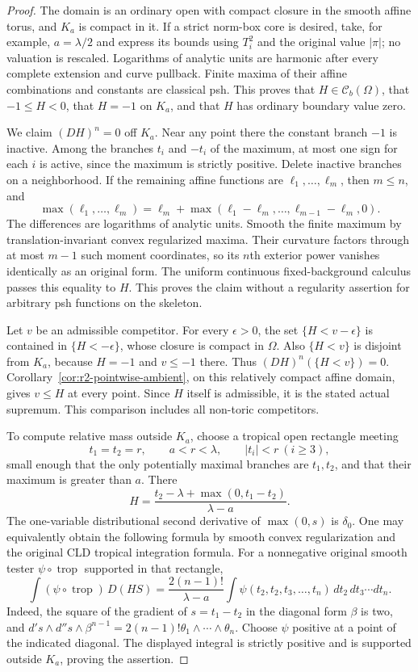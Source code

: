 \documentclass[11pt,a4paper]{article}
\numberwithin{equation}{section}
\theoremstyle{definition}
\theoremstyle{remark}
\newcommand{\Cb}{\mathcal C_b}
\begin{document}
\begin{proof}
The domain is an ordinary open with compact closure in the
smooth affine torus, and $K_a$ is compact in it. If a strict
norm-box core is desired, take, for example, $a=\lambda/2$
and express its bounds using $T_i^2$ and the original value
$|\pi|$; no valuation is rescaled. Logarithms of analytic units
are harmonic after every complete extension and curve pullback.
Finite maxima of their affine combinations and constants are
classical psh. This proves that $H\in\Cb(\Omega)$, that
$-1\leq H<0$, that $H=-1$ on $K_a$, and that $H$ has ordinary
boundary value zero.

We claim $(DH)^n=0$ off $K_a$. Near any point there the constant
branch $-1$ is inactive. Among the branches $t_i$ and $-t_i$
of the maximum, at most one sign for each $i$ is active, since
the maximum is strictly positive. Delete inactive branches
on a neighborhood. If the remaining affine functions are
$\ell_1,\ldots,\ell_m$, then $m\leq n$, and
\[
 \max(\ell_1,\ldots,\ell_m)
    =\ell_m+\max(\ell_1-\ell_m,\ldots,
                         \ell_{m-1}-\ell_m,0).
\]
The differences are logarithms of analytic units. Smooth the
finite maximum by translation-invariant convex regularized
maxima. Their curvature factors through at most $m-1$ such
moment coordinates, so its $n$th exterior power vanishes
identically as an original form. The uniform continuous
fixed-background calculus passes this equality to $H$.
This proves the claim without a regularity assertion for
arbitrary psh functions on the skeleton.

Let $v$ be an admissible competitor. For every $\epsilon>0$,
the set $\{H<v-\epsilon\}$ is contained in
$\{H<-\epsilon\}$, whose closure is compact in $\Omega$.
Also $\{H<v\}$ is disjoint from $K_a$, because $H=-1$ and
$v\leq-1$ there. Thus $(DH)^n(\{H<v\})=0$.
Corollary~\ref{cor:r2-pointwise-ambient}, on this relatively
compact affine domain, gives $v\leq H$ at every point.
Since $H$ itself is admissible, it is the stated actual
supremum. This comparison includes all non-toric competitors.

To compute relative mass outside $K_a$, choose a tropical open
rectangle meeting
\[
 t_1=t_2=r,\qquad a<r<\lambda,
 \qquad |t_i|<r\ (i\geq3),
\]
small enough that the only potentially maximal branches are
$t_1,t_2$, and that their maximum is greater than $a$.
There
\[
 H=\frac{t_2-\lambda+\max(0,t_1-t_2)}{\lambda-a}.
\]
The one-variable distributional second derivative of
$\max(0,s)$ is $\delta_0$. One may equivalently obtain the
following formula by smooth convex regularization and the
original CLD tropical integration formula. For a nonnegative
original smooth tester $\psi\circ\operatorname{trop}$ supported
in that rectangle,
\[
 \int(\psi\circ\operatorname{trop})\,D(HS)
   =\frac{2(n-1)!}{\lambda-a}
     \int\psi(t_2,t_2,t_3,\ldots,t_n)
                    \,dt_2\,dt_3\cdots dt_n.
\]
Indeed, the square of the gradient of $s=t_1-t_2$ in the
diagonal form $\beta$ is two, and
$d's\wedge d''s\wedge\beta^{n-1}
 =2(n-1)!\theta_1\wedge\cdots\wedge\theta_n$.
Choose $\psi$ positive at a point of the indicated diagonal.
The displayed integral is strictly positive and is supported
outside $K_a$, proving the assertion.
\end{proof}
\end{document}
